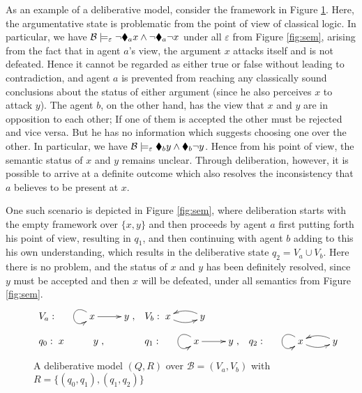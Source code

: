 \documentclass[greybox]{svmult}
\newcommand{\views}{\mathcal B}
\newcommand{\sem}{\varepsilon}
\begin{document}
As an example of a deliberative model, consider the framework in Figure \ref{fig:del1}. Here, the argumentative state is problematic from the point of view of classical logic. In particular, we have $\views \models_\sem \neg \cdia_a x \land \neg \cdia_a \neg x$ under all $\sem$ from Figure \ref{fig:sem}, arising from the fact that in agent $a$'s view, the argument $x$ attacks itself and is not defeated. Hence it cannot be regarded as either true or false without leading to contradiction, and agent $a$ is prevented from reaching any classically sound conclusions about the status of either argument (since he also perceives $x$ to attack $y$). The agent $b$, on the other hand, has the view that $x$ and $y$ are in opposition to each other; If one of them is accepted the other must be rejected and vice versa. But he has no information which suggests choosing one over the other. In particular, we have $\views \models_\sem \cdia_b y \land \cdia_b \neg y$. Hence from his point of view, the semantic status of $x$ and $y$ remains unclear. Through deliberation, however, it is possible to arrive at a definite outcome which also resolves the inconsistency that $a$ believes to be present at $x$. 

One such scenario is depicted in Figure \ref{fig:sem}, where deliberation starts with the empty framework over $\{x,y\}$ and then proceeds by agent $a$ first putting forth his point of view, resulting in $q_1$, and then continuing with agent $b$ adding to this his own understanding, which results in the deliberative state $q_2 = V_a \cup V_b$. Here there is no problem, and the status of $x$ and $y$ has been definitely resolved, since $y$ must be accepted and then $x$ will be defeated, under all semantics from Figure \ref{fig:sem}.

\begin{figure}
$\begin{array}{llllll}
V_a: \xymatrix{& x \ar[r] \ar@(lu,ld) & y}, & V_b: \xymatrix{x \ar@/_/[r] & y \ar@/_/[l] } \\ \\
q_0: \xymatrix{ x & y }, & q_1: \xymatrix{& x \ar@(lu,ld)  \ar[r] & y }, & q_2: \xymatrix{&  x \ar@(lu,ld)  \ar@/_/[r] & y \ar@/_/[l]}
\end{array}$
\caption{A deliberative model $(Q,R)$ over $\views = (V_a,V_b)$ with $R = \{(q_0,q_1),(q_1,q_2)\}$}
\label{fig:del1}
\end{figure}
\end{document}
